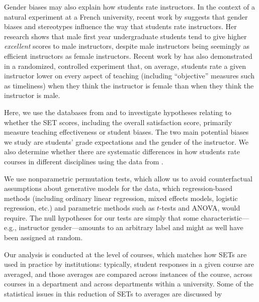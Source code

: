 \documentclass[12pt]{article}
\begin{document}
Gender biases may also explain how students rate instructors.
In the context of a natural experiment at a French university, recent work by \citet{Boring2015} suggests that gender biases and stereotypes influence the way that students rate instructors. Her research shows that male first year undergraduate students tend to give higher \textit{excellent} scores to male instructors, despite male instructors being seemingly as efficient instructors as female instructors. Recent work by \citet{MacNell2014} has also demonstrated in a randomized, controlled experiment that, on average, students rate a given instructor 
lower on every aspect of teaching (including ``objective'' measures such as
timeliness) when they think the instructor is female than when 
they think the instructor is male. 

Here, we use the databases from \citet{Boring2015} and \citet{MacNell2014} to investigate 
hypotheses relating to whether the SET scores, including the overall satisfaction score, primarily measure teaching
effectiveness or student biases. The two main potential biases we study are students' grade expectations and the gender of the instructor. We also determine whether there are systematic differences
in how students rate courses in different disciplines using the data from \citet{Boring2015}.

We use nonparametric permutation tests, which allow us to avoid counterfactual assumptions about
generative models for the data, which regression-based methods (including
ordinary linear regression, mixed effects models, logistic regression, etc.) and parametric
methods such as $t$-tests and ANOVA, would require.
The null hypotheses for our tests are simply that some 
characteristic---e.g., instructor gender---amounts to an arbitrary label and might as well
have been assigned at random. 

Our analysis is conducted at the level of courses, which matches how SETs are
used in practice by institutions: typically, student responses in a given course
are averaged, and those averages are compared across instances of the course,
across courses in a department and across departments within a university.
Some of the statistical issues in this reduction of SETs to averages are 
discussed by \citet{Stark2014}
\end{document}
